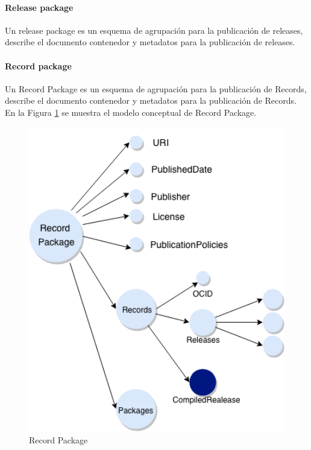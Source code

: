 \paragraph{Release package}
Un release package es un esquema de agrupación para la publicación de releases, describe el documento contenedor y metadatos para la publicación de releases.

\paragraph{Record package}

Un Record Package es un esquema de agrupación para la publicación de Records, describe el documento contenedor y metadatos para la publicación de Records. En la Figura \ref{img:Record Package} se muestra el modelo conceptual de Record Package.



\begin{figure}[ht!]
    \centering
    \includegraphics[width=150mm]{figuras/Diagramas-RecordPackage.png}
    \caption{Record Package}
    \label{img:Record Package}
\end{figure}


